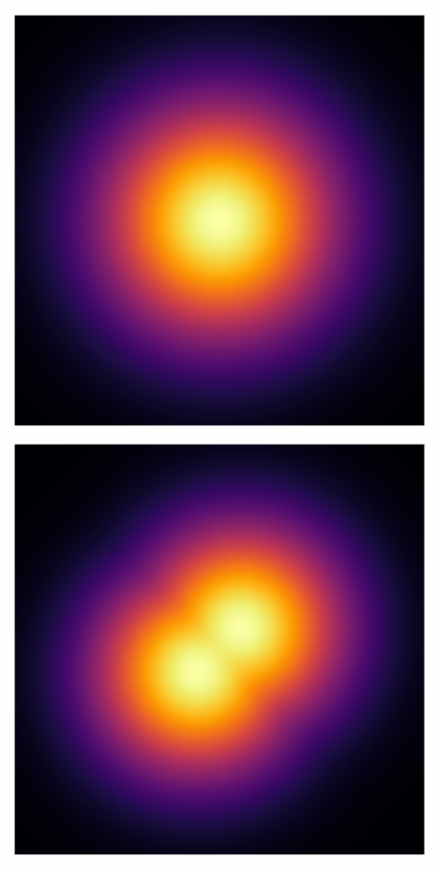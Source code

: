 \begin{figure}[t]
  \centering
    \begin{minipage}{0.333\linewidth}
      \centering
      \includegraphics[width=\linewidth]{../img/heatmap_path_1.pdf}
    \end{minipage}%
    \begin{minipage}{0.333\linewidth}
      \centering
      \includegraphics[width=\linewidth]{../img/heatmap_path_2.pdf}

\end{minipage}
\end{figure}
